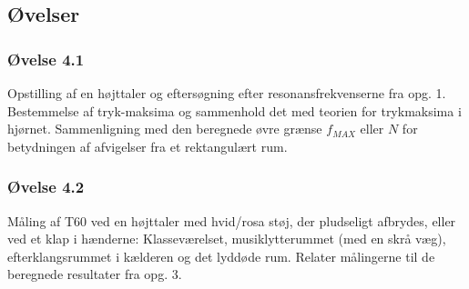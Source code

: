 \subsection{Øvelser}
\subsubsection{Øvelse 4.1}
Opstilling af en højttaler og eftersøgning efter resonansfrekvenserne fra opg. 1. Bestemmelse af tryk-maksima og sammenhold det med teorien for trykmaksima i hjørnet. Sammenligning med den beregnede øvre grænse $f_{MAX}$ eller $N$ for betydningen af afvigelser fra et rektangulært rum.

\subsubsection{Øvelse 4.2}
Måling af T60 ved en højttaler med hvid/rosa støj, der pludseligt afbrydes, eller ved et klap i hænderne: Klasseværelset, musiklytterummet (med en skrå væg), efterklangsrummet i kælderen og det lyddøde rum. Relater målingerne til de beregnede resultater fra opg. 3.
